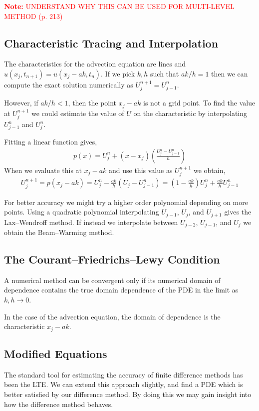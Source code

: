 \documentclass[12pt]{article}
\newcommand{\note}[1]{\textcolor{red}{\textbf{Note:} #1}}
\begin{document}
\note{UNDERSTAND WHY THIS CAN BE USED FOR MULTI-LEVEL METHOD (p. 213)}

\subsection{Characteristic Tracing and Interpolation}
The characteristics for the advection equation are lines and \( u(x_j,t_{n+1}) = u(x_j-ak,t_n) \). If we pick \( k,h \) such that \( ak/h = 1 \) then we can compute the exact solution numerically as \( U_j^{n+1} = U_{j-1}^n \).

However, if \( ak/h<1 \), then the point \( x_j - ak \) is not a grid point. To find the value at \( U_j^{n+1} \) we could estimate the value of \( U \) on the characteristic by interpolating \( U_{j-1}^n \) and \( U_j^n \).

Fitting a linear function gives,
\begin{align*}
    p(x) = U_j^n + (x-x_j) \left( \frac{U_j^n-U_{j-1}^n}{h} \right)
\end{align*}
When we evaluate this at \( x_j - ak \) and use this value as \( U_j^{n+1} \) we obtain,
\begin{align*}
    U_j^{n+1} = p(x_j-ak) = U_j^n - \frac{ak}{h} (U_j-U_{j-1}^n) = \left( 1-\frac{ak}{h} \right) U_j^n + \frac{ak}{h} U_{j-1}^n
\end{align*}

For better accuracy we might try a higher order polynomial depending on more points. Using a quadratic polynomial interpolating \( U_{j-1} \), \( U_j \), and \( U_{j+1} \) gives the Lax--Wendroff method. If instead we interpolate between \( U_{j-2} \), \( U_{j-1} \), and \( U_j \) we obtain the Beam--Warming method.


\subsection{The Courant--Friedrichs--Lewy Condition}

\begin{theorem}
A numerical method can be convergent only if its numerical domain of dependence contains the true domain dependence of the PDE in the limit as \( k, h \to 0\).
\end{theorem}

In the case of the advection equation, the domain of dependence is the characteristic \( x_j - ak \).

\subsection{Modified Equations}
The standard tool for estimating the accuracy of finite difference methods has been the LTE. We can extend this approach slightly, and find a PDE which is better satisfied by our difference method. By doing this we may gain insight into how the difference method behaves.
\end{document}
